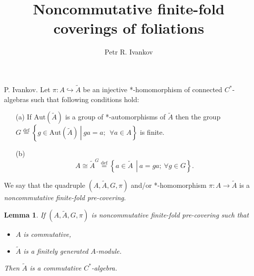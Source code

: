 \documentclass{beamer}
\title{Noncommutative finite-fold coverings of foliations}
\institute
{
Noncommutative geometry and topology
}
\author{Petr R. Ivankov  }
\theoremstyle{plain}
\newtheorem{lem}{Lemma}%
\newcommand{\be}{\begin{equation}}
\newcommand{\ee}{\end{equation}}
\newcommand{\Aut}{\mathrm{Aut}}
\newcommand{\bydef}{\stackrel{\mathrm{def}}{=}}
\newcommand{\hookto}{\hookrightarrow}        %
\begin{document}
\begin{frame}
  \titlepage
\end{frame}
\begin{frame}
	   \begin{definition}\label{pre_defn} \alert{P. Ivankov}.
		Let $\pi: A \hookto \widetilde{A}$ be an injective *-homomorphism of connected  $C^*$-algebras such that following conditions hold:
		\begin{enumerate}
			\item[(a)] If $\Aut\left(\widetilde{A} \right)$ is a group of *-automorphisms of $\widetilde{A}$ then the group  
			$
			G \bydef \left\{ \left.g \in \Aut\left(\widetilde{A} \right)~\right|~ ga = a;~~\forall a \in A\right\}
			$
			is finite.
			\item[(b)] 	\be\label{cond_b_eqn}
			A \cong \widetilde{A}^G\stackrel{\text{def}}{=}\left\{\left.a\in \widetilde{A}~~\right|~ a = g a;~ \forall g \in G\right\}.\ee
		\end{enumerate}
		We say that the quadruple $\left(A, \widetilde{A}, G, \pi \right)$ and/or *-homomorphism $\pi: A \to \widetilde{A}$   is a \textit{noncommutative finite-fold  pre-covering}. 
	\end{definition}
\begin{lem}
If $\left(A, \widetilde{A}, G, \pi \right)$ is noncommutative finite-fold  pre-covering such that
\begin{itemize}
	\item $A$ is commutative,
	\item $\widetilde{A}$ is a finitely generated $A$-module.
\end{itemize}
Then $\widetilde{A}$ is a commutative $C^*$-algebra.
\end{lem}
\end{frame}
\end{document}

